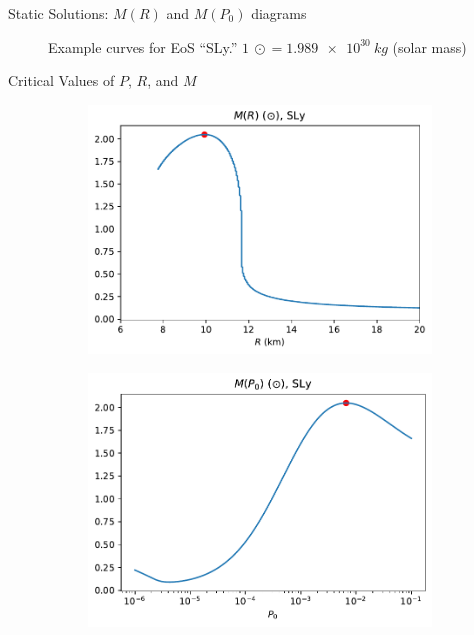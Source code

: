 \documentclass[handout]{beamer}
\begin{document}
\begin{frame}{Static Solutions: $M(R)$ and $M(P_0)$ diagrams}
\begin{figure}[h!]
\begin{subfigure}{.5\textwidth}
            \end{subfigure}
            \caption[]{Example curves for EoS ``SLy.'' $\SI{1}{\odot} = \SI{1.989e+30}{kg}$ (solar mass)}
        \end{figure}
    \end{frame}

    \begin{frame}{Critical Values of $P$, $R$, and $M$}
        \vspace{-10pt}
        \begin{figure}[h!]
            \centering
            \begin{subfigure}{.5\textwidth}
                \includegraphics[width = \textwidth]{../paper/images/tov/r_analysis,SLy.pdf}
            \end{subfigure}%
            \begin{subfigure}{.5\textwidth}
                \includegraphics[width = \textwidth]{../paper/images/tov/p0_analysis,SLy.pdf}

\end{subfigure}
\end{figure}
\end{frame}
\end{document}
